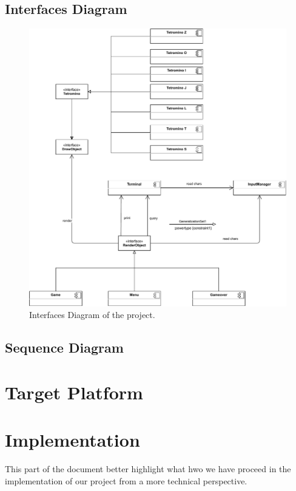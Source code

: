 \documentclass{article}
\begin{document}
\subsection{Interfaces Diagram}
\begin{figure}[H]
    \centering
    \includegraphics[width=\linewidth]{img/InterafcesDiagram.pdf}
    \caption{Interfaces Diagram of the project.}
    \label{fig:gather}
\end{figure}

\subsection{Sequence Diagram}

\section{Target Platform}

\section{Implementation}
This part of the document better highlight what hwo we have proceed in the implementation of our project from a more technical perspective.
\end{document}

